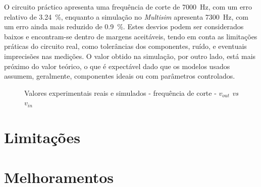 O circuito práctico apresenta uma frequência de corte de \SI{7000}{\hertz}, com um erro relativo de \SI{3.24}{\percent}, enquanto a simulação no \textit{Multisim} apresenta \SI{7300}{\hertz}, com um erro ainda mais reduzido de \SI{0.9}{\percent}. Estes desvios podem ser considerados baixos e encontram-se dentro de margens aceitáveis, tendo em conta as limitações práticas do circuito real, como tolerâncias dos componentes, ruído, e eventuais imprecisões nas medições. O valor obtido na simulação, por outro lado, está mais próximo do valor teórico, o que é expectável dado que os modelos usados assumem, geralmente, componentes ideais ou com parâmetros controlados.

\begin{figure}[hbtp]
	\centering%
		\centering
		\qquad
		\caption{Valores experimentais reais e simulados - frequência de corte - $v_{out}$ \textit{vs} $v_{in}$}%
		\label{fig:simulacaovout}%
	\end{figure}


\section{Limitações}
\section{Melhoramentos}



